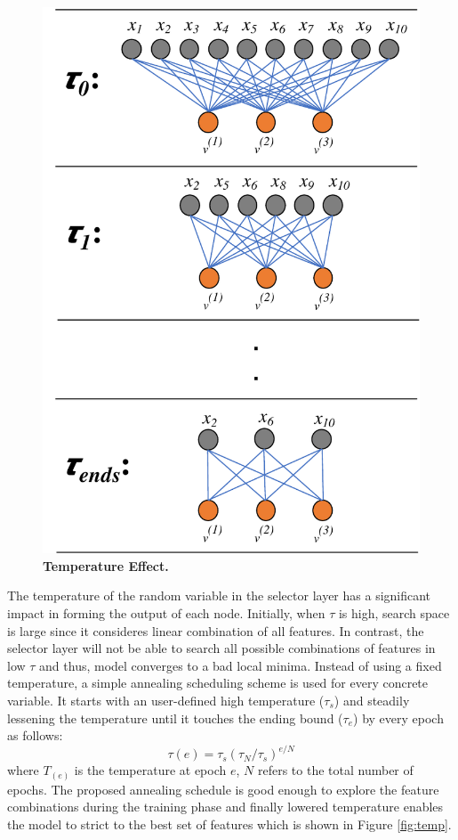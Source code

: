 \documentclass{bioinfo}
\begin{document}
\begin{figure}[hbt]
    \centering
    \includegraphics[scale=0.5]{fig/temp-change.pdf}
    \caption{\textbf{Temperature Effect.}  }
    \label{fig:temp-change}
\end{figure}

The temperature of the random variable in the selector layer has a significant impact in forming the output of each node. Initially, when $\tau$ is high, search space is large since it consideres linear combination of all features. In contrast, the selector layer will not be able to search all possible combinations of features in low $\tau$ and thus, model converges to a bad local minima. Instead of using a fixed temperature, a simple annealing scheduling scheme is used for every concrete variable. It starts with an user-defined high temperature ($\tau_s$) and steadily lessening the temperature until it touches the ending bound ($\tau_e$) by every epoch as follows: 
\begin{equation}
\tau(e) = \tau_s(\tau_N/\tau_s)^{e/N}
\end{equation}
where $T_{(e)}$ is the temperature at epoch $e$, $N$ refers to the total number of epochs. The proposed annealing schedule is good enough to explore the feature combinations during the training phase and finally lowered temperature enables the model to strict to the best set of features which is shown in Figure \ref{fig:temp}.
\end{document}
